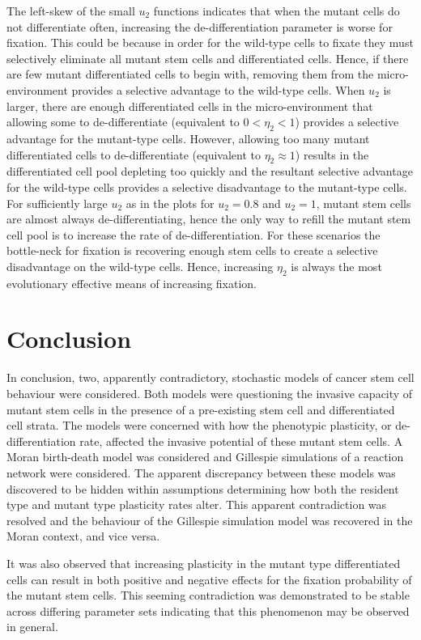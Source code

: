 \documentclass[12pt]{article}
\begin{document}
The left-skew of the small $u_2$ functions indicates that when the mutant cells do not differentiate often, increasing the de-differentiation parameter is worse for fixation. This could be because in order for the wild-type cells to fixate they must selectively eliminate all mutant stem cells and differentiated cells. Hence, if there are few mutant differentiated cells to begin with, removing them from the micro-environment provides a selective advantage to the wild-type cells. When $u_2$ is larger, there are enough differentiated cells in the micro-environment that allowing some to de-differentiate (equivalent to $0<\eta_2<1$) provides a selective advantage for the mutant-type cells. However, allowing too many mutant differentiated cells to de-differentiate (equivalent to $\eta_2\approx 1$) results in the differentiated cell pool depleting too quickly and the resultant selective advantage for the wild-type cells provides a selective disadvantage to the mutant-type cells. For sufficiently large $u_2$ as in the plots for $u_2=0.8$ and $u_2=1$, mutant stem cells are almost always de-differentiating, hence the only way to refill the mutant stem cell pool is to increase the rate of de-differentiation. For these scenarios the bottle-neck for fixation is recovering enough stem cells to create a selective disadvantage on the wild-type cells. Hence, increasing $\eta_2$ is always the most evolutionary effective means of increasing fixation.

\section{Conclusion}
In conclusion, two, apparently contradictory, stochastic models of cancer stem cell behaviour were considered. Both models were questioning the invasive capacity of mutant stem cells in the presence of a pre-existing stem cell and differentiated cell strata. The models were concerned with how the phenotypic plasticity, or de-differentiation rate, affected the invasive potential of these mutant stem cells. A Moran birth-death model was considered and Gillespie simulations of a reaction network were considered. The apparent discrepancy between these models was discovered to be hidden within assumptions determining how both the resident type and mutant type plasticity rates alter. This apparent contradiction was resolved and the behaviour of the Gillespie simulation model was recovered in the Moran context, and vice versa.

It was also observed that increasing plasticity in the mutant type differentiated cells can result in both positive and negative effects for the fixation probability of the mutant stem cells. This seeming contradiction was demonstrated to be stable across differing parameter sets indicating that this phenomenon may be observed in general. 
\end{document}
